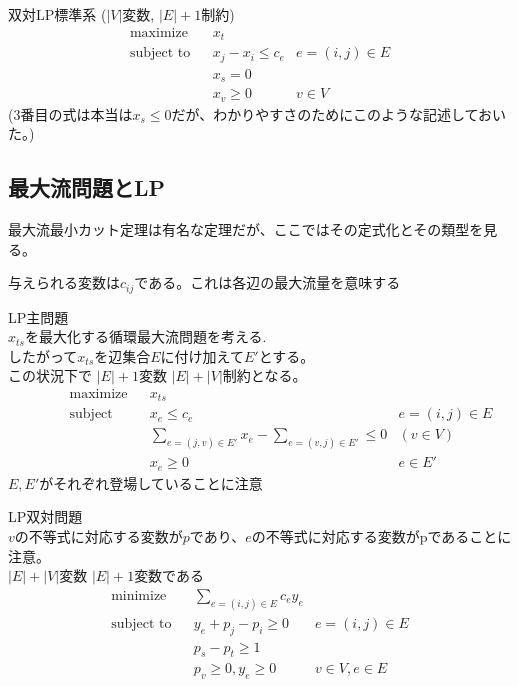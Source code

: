 \documentclass[13pt, a4paper, landscape]{jarticle}
\theoremstyle{nonitalic} %
\begin{document}
双対LP標準系
($|V|$変数, $|E|+1$制約)
\begin{align}
 &&&&&\textrm{maximize}   && x_t  \\
 &&&&&\textrm{subject to} && x_j - x_i\leq c_e & e = (i,j) \in E  &&&&&\\
 &&&&&                    && x_s = 0 &&&&&& \\
 &&&&&                    && x_v \geq 0 & v \in V &&&&&
\end{align}
(3番目の式は本当は$x_s \leq 0$だが、わかりやすさのためにこのような記述しておいた。) \\


\subsection{最大流問題とLP}
最大流最小カット定理は有名な定理だが、ここではその定式化とその類型を見る。

与えられる変数は$c_{ij}$である。これは各辺の最大流量を意味する

LP主問題 \\
$x_{ts}$を最大化する循環最大流問題を考える. \\
したがって$x_{ts}$を辺集合$E$に付け加えて$E'$とする。\\
この状況下で $|E|+1$変数 $|E|+|V|$制約となる。
\begin{align}
 &&&&&\textrm{maximize}   && x_{ts}  \\
 &&&&&\textrm{subject to} && x_e\leq c_e & e = (i,j) \in E  &&&&&\\
 &&&&&                    && \sum_{e = (j,v) \in E'} x_e - \sum_{e=(v,j) \in E'} \leq 0 & (v \in V) &&&&& \\
 &&&&&                    && x_e \geq 0 & e \in E' &&&&&
\end{align}
$E, E'$がそれぞれ登場していることに注意


LP双対問題 \\
$v$の不等式に対応する変数が$p$であり、$e$の不等式に対応する変数がpであることに注意。\\
$|E|+|V|$変数 $|E|+1$変数である
\begin{align}
 &&&&&\textrm{minimize}   && \sum_{e=(i,j)\in E} c_e y_e  \\
 &&&&&\textrm{subject to} && y_e + p_j - p_i \geq 0 &  e = (i, j) \in E  &&&&&\\
 &&&&&                    && p_s - p_t  \geq 1         &&&&& \\
 &&&&&                    && p_v \geq 0,  y_e \geq 0 &  v \in V, e \in E &&&&&
\end{align}
\end{document}
